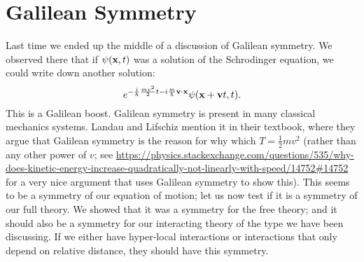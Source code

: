 \section{Galilean Symmetry}
Last time we ended up the middle of a discussion of Galilean symmetry. We observed there that if $\psi(\mathbf{x}, t)$ was a solution of the Schrodinger equation, we could write down another solution:
\begin{equation}
    e^{-\frac{i}{\hbar}\frac{mv^2}{2}t - i\frac{m}{\hbar}\mathbf{v}\cdot\mathbf{x}}\psi(\mathbf{x} + \mathbf{v}t, t).
\end{equation}
This is a Galilean boost. Galilean symmetry is present in many classical mechanics systems. Landau and Lifschiz mention it in their textbook, where they argue that Galilean symmetry is the reason for why which $T = \frac{1}{2}mv^2$ (rather than any other power of $v$; see \url{https://physics.stackexchange.com/questions/535/why-does-kinetic-energy-increase-quadratically-not-linearly-with-speed/14752#14752} for a very nice argument that uses Galilean symmetry to show this). This seems to be a symmetry of our equation of motion; let us now test if it is a symmetry of our full theory. We showed that it was a symmetry for the free theory; and it should also be a symmetry for our interacting theory of the type we have been discussing. If we either have hyper-local interactions or interactions that only depend on relative distance, they should have this symmetry.

